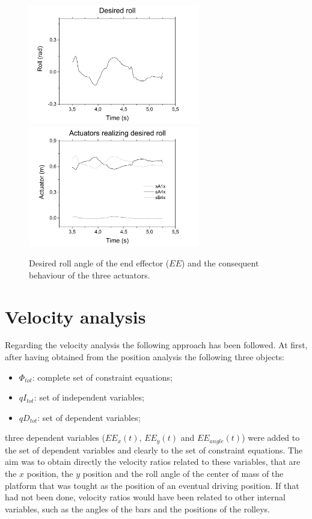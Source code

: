 \documentclass[10.5pt, twocolumn]{article}
\begin{document}
\begin{figure}[h!]
	\includegraphics[width=7.5cm]{Images/RollDesired_InvKine}\\
    \includegraphics[width=7.5cm]{Images/Actuators_InvKine}
	\caption{Desired roll angle of the end effector (\( EE \)) and the consequent behaviour of the three actuators.}
  \label{fig:experimental}
\end{figure}


\section{Velocity analysis}
Regarding the velocity analysis the following approach has been followed.
At first, after having obtained from the position analysis the following three objects:
  \begin{itemize}
    \item \( \Phi_{tot}\): complete set of constraint equations;
    \item \( qI_{tot}\): set of independent variables;
    \item \( qD_{tot}\): set of dependent variables;
  \end{itemize}
three dependent variables (\( EE_{x}(t) \), \( EE_{y}(t) \) and \(EE_{angle}(t)\)) were added to the set of dependent variables and clearly to the set of constraint equations. The aim was to obtain directly the velocity ratios related to these variables, that are the \( x \) position, the \( y \) position and the roll angle of the center of mass of the platform that was tought as the position of an eventual driving position.
If that had not been done, velocity ratios would have been related  to other internal variables, such as the angles of the bars and the positions of the rolleys.
\end{document}
